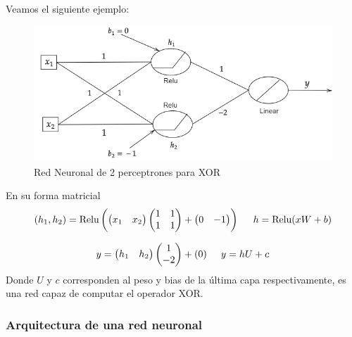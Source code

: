 Veamos el siguiente ejemplo: 

\begin{figure}[H]
    \centering
    \includegraphics[scale=.5]{img/cap7_xor}
    \caption{Red Neuronal de 2 perceptrones para XOR}
\end{figure}

En su forma matricial 
$$
(h_1 , h_2) = \text{Relu} \left ( \begin{pmatrix}
x_1 & x_2  
\end{pmatrix} \begin{pmatrix}
1 &1 \\ 
 1 & 1
\end{pmatrix} + \begin{pmatrix}
0 & -1 
\end{pmatrix}\right) \hspace{0.5cm} h = \text{Relu}(xW + b)
$$

$$
y = \begin{pmatrix}
h_1 & h_2 
\end{pmatrix}\begin{pmatrix}
1 \\ 
-2 
\end{pmatrix} + (0) \hspace{0.5cm} y = hU + c
$$
Donde $U$ y $c$ corresponden al peso y bias de la última capa respectivamente, es una red capaz de computar el operador XOR.


\subsubsection{Arquitectura de una red neuronal}

